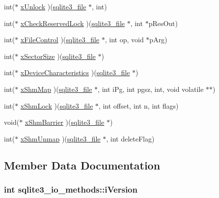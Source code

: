 \begin{CompactItemize}
int($\ast$ \hyperlink{structsqlite3__io__methods_c90eeb9153eb6608a1872760660e718f}{xUnlock} )(\hyperlink{structsqlite3__file}{sqlite3\_\-file} $\ast$, int)
\item 
int($\ast$ \hyperlink{structsqlite3__io__methods_97f5eb0c2dc7e1cf2f8ecd6857e4c77c}{xCheckReservedLock} )(\hyperlink{structsqlite3__file}{sqlite3\_\-file} $\ast$, int $\ast$pResOut)
\item 
int($\ast$ \hyperlink{structsqlite3__io__methods_5d2a5ba7937b4a6c6c5ba62c4e2b9166}{xFileControl} )(\hyperlink{structsqlite3__file}{sqlite3\_\-file} $\ast$, int op, void $\ast$pArg)
\item 
int($\ast$ \hyperlink{structsqlite3__io__methods_8436e6eeac404b35057be97f3c2b5c3d}{xSectorSize} )(\hyperlink{structsqlite3__file}{sqlite3\_\-file} $\ast$)
\item 
int($\ast$ \hyperlink{structsqlite3__io__methods_ce5e9e9f267c6c57023109c0658f2683}{xDeviceCharacteristics} )(\hyperlink{structsqlite3__file}{sqlite3\_\-file} $\ast$)
\item 
int($\ast$ \hyperlink{structsqlite3__io__methods_42d21006b7f01acb258986f2c090c64d}{xShmMap} )(\hyperlink{structsqlite3__file}{sqlite3\_\-file} $\ast$, int iPg, int pgsz, int, void volatile $\ast$$\ast$)
\item 
int($\ast$ \hyperlink{structsqlite3__io__methods_58f4a6b0df86440029cc5fa1b65b1b4e}{xShmLock} )(\hyperlink{structsqlite3__file}{sqlite3\_\-file} $\ast$, int offset, int n, int flags)
\item 
void($\ast$ \hyperlink{structsqlite3__io__methods_edf4a59fa25ad33e0625a2aa0f6f2184}{xShmBarrier} )(\hyperlink{structsqlite3__file}{sqlite3\_\-file} $\ast$)
\item 
int($\ast$ \hyperlink{structsqlite3__io__methods_f69cbc7ece1854576ac262f986871563}{xShmUnmap} )(\hyperlink{structsqlite3__file}{sqlite3\_\-file} $\ast$, int deleteFlag)
\end{CompactItemize}


\subsection{Member Data Documentation}
\hypertarget{structsqlite3__io__methods_d1c72bdfde750a09a797f314a096a965}{
\subsubsection[iVersion]{\setlength{\rightskip}{0pt plus 5cm}int {\bf sqlite3\_\-io\_\-methods::iVersion}}}
\label{structsqlite3__io__methods_d1c72bdfde750a09a797f314a096a965}


